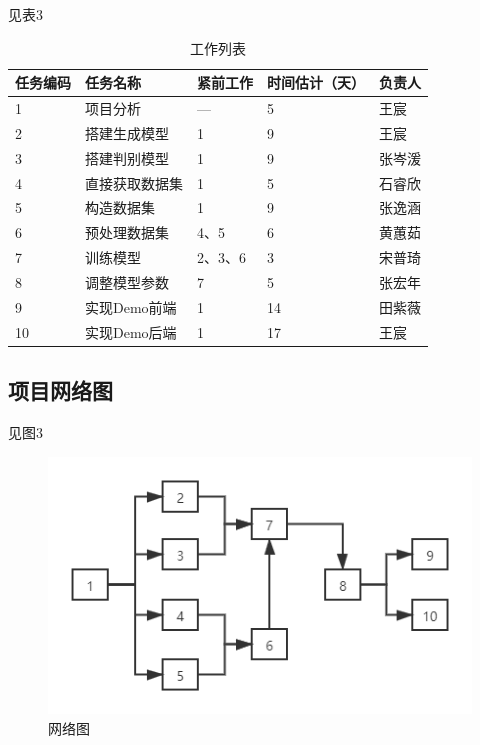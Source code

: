 \documentclass[
  hyperref, a4paper]{ctexart}
\begin{document}
见表3

\begin{table}
    \caption{工作列表}
    \begin{tabular}{|p{2.0cm}<{\centering}|p{2.0cm}<{\centering}|p{2.0cm}<{\centering}|p{2.0cm}<{\centering}|p{2.0cm}<{\centering}|}
    \hline
    任务编码 & 任务名称     & 紧前工作  & 时间估计（天） & 负责人 \\ \hline
    1    & 项目分析     & —     & 5       & 王宸  \\ \hline
    2    & 搭建生成模型   & 1     & 9       & 王宸  \\ \hline
    3    & 搭建判别模型   & 1     & 9       & 张岑湲 \\ \hline
    4    & 直接获取数据集  & 1     & 5       & 石睿欣 \\ \hline
    5    & 构造数据集    & 1     & 9       & 张逸涵 \\ \hline
    6    & 预处理数据集   & 4、5   & 6       & 黄蕙茹 \\ \hline
    7    & 训练模型     & 2、3、6 & 3       & 宋普琦 \\ \hline
    8    & 调整模型参数   & 7     & 5       & 张宏年 \\ \hline
    9    & 实现Demo前端 & 1     & 14      & 田紫薇 \\ \hline
    10   & 实现Demo后端 & 1     & 17      & 王宸  \\ \hline
    \end{tabular}
\end{table}

\hypertarget{ux9879ux76eeux7f51ux7edcux56fe}{%
\subsection{项目网络图}\label{ux9879ux76eeux7f51ux7edcux56fe}}

见图3

\begin{figure}
\centering
\includegraphics{2.png}
\caption{网络图}
\end{figure}
\end{document}
